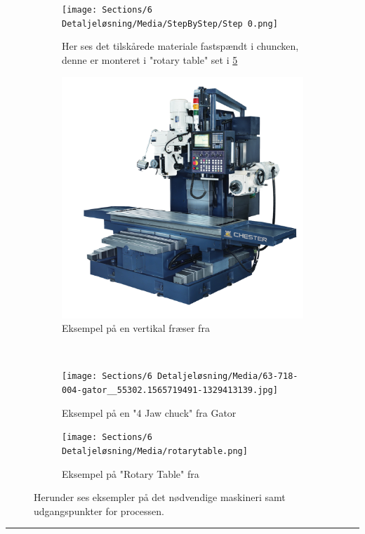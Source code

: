 \begin{figure}[H]
    \begin{subfigure}[b]{0.45\textwidth}
        \centering
        \texttt{[image: Sections/6 Detaljeløsning/Media/StepByStep/Step 0.png]}
        \caption{Her ses det tilskårede materiale fastspændt i chuncken, denne er monteret i "rotary table" set i \ref{fig:RotTable}}
        \label{fig:Step0}
    \end{subfigure}
    \hfill
    \begin{subfigure}[b]{0.45\textwidth}
        \centering
        \includegraphics[width=0.60\linewidth]{Sections/6 Detaljeløsning/Media/Vertical-Horizontal-Bed-Type-CNC-Milling-Machine-•-Chester-•-GM1500VS-3222663431.png}
        \caption{Eksempel på en vertikal fræser fra \parencite{CHESTER2025GM1500VSTools}}
        \label{fig:VerticalMill}
    \end{subfigure}
    \\
    \begin{subfigure}[b]{0.45\textwidth}
        \centering
        \texttt{[image: Sections/6 Detaljeløsning/Media/63-718-004-gator\_\_55302.1565719491-1329413139.jpg]}
        \caption{Eksempel på en "4 Jaw chuck" fra Gator \parencite{PennToolCo.2025GatorInc}}
        \label{fig:Chuck}
    \end{subfigure}
    \hfill
    \begin{subfigure}[b]{0.45\textwidth}
        \centering
        \texttt{[image: Sections/6 Detaljeløsning/Media/rotarytable.png]}
        \caption{Eksempel på "Rotary Table" fra \parencite{Haas2025RotaryTables}}
        \label{fig:RotTable}
    \end{subfigure}
\caption{Herunder ses eksempler på det nødvendige maskineri samt udgangspunkter for processen.}
\end{figure} \plainbreak{-.5}

